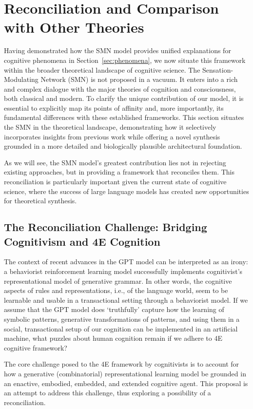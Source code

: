 \section{Reconciliation and Comparison with Other Theories}
\label{sec:comparison}
Having demonstrated how the SMN model provides unified explanations for cognitive phenomena in Section~\ref{sec:phenomena}, we now situate this framework within the broader theoretical landscape of cognitive science. The Sensation-Modulating Network (SMN) is not proposed in a vacuum. It enters into a rich and complex dialogue with the major theories of cognition and consciousness, both classical and modern. To clarify the unique contribution of our model, it is essential to explicitly map its points of affinity and, more importantly, its fundamental differences with these established frameworks. This section situates the SMN in the theoretical landscape, demonstrating how it selectively incorporates insights from previous work while offering a novel synthesis grounded in a more detailed and biologically plausible architectural foundation.

As we will see, the SMN model's greatest contribution lies not in rejecting existing approaches, but in providing a framework that reconciles them. This reconciliation is particularly important given the current state of cognitive science, where the success of large language models has created new opportunities for theoretical synthesis.

\subsection{The Reconciliation Challenge: Bridging Cognitivism and 4E Cognition}
The context of recent advances in the GPT model can be interpreted as an irony: a behaviorist reinforcement learning model successfully implements cognitivist's representational model of generative grammar. In other words, the cognitive aspects of rules and representations, i.e., of the language world, seem to be learnable and usable in a transactional setting through a behaviorist model. If we assume that the GPT model does `truthfully' capture how the learning of symbolic patterns, generative transformations of patterns, and using them in a social, transactional setup of our cognition can be implemented in an artificial machine, what puzzles about human cognition remain if we adhere to 4E cognitive framework? 

The core challenge posed to the 4E framework by cognitivists is to account for how a generative (combinatorial) representational learning model be grounded in an enactive, embodied, embedded, and extended cognitive agent. This proposal is an attempt to address this challenge, thus exploring a possibility of a reconciliation.


